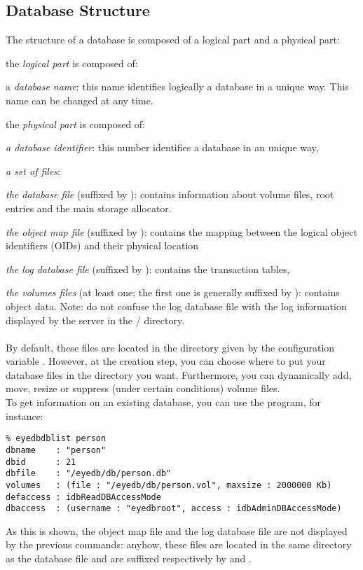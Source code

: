 \subsection{Database Structure}
The structure of a database is composed of a logical part and a physical
part:
\bi
\item the \emph{logical part} is composed of:
\be
\item a \emph{database name}: this name identifies logically 
a database in a unique way. This name can be changed at any time.
\ee
\item the \emph{physical part} is composed of:
\be
\item \emph{a database identifier}: this number identifies
a database in an unique way,
\ee
\item \emph{a set of files}:
\be
\item \emph{the database file} (suffixed by ): contains information
about volume files, root entries and the main storage allocator.
\item \emph{the object map file} (suffixed by ): contains
the mapping between the logical object identifiers (OIDs) and their
physical location
\item \emph{the log database file} (suffixed by ): contains the transaction
tables,
\item \emph{the volumes files} (at least one; the first one is generally suffixed by ):
contains object data.
\ee
\ei
Note: do not confuse the log database file with the log information displayed by
the server in the \tdir/ directory.
\\
\\
By default, these files are located in the directory given by the configuration
variable .
However, at the creation step, you can choose where to put your database
files in the directory you want. Furthermore, you can dynamically add, 
move, resize or suppress (under certain conditions) volume files.
\\
To get information on an existing database, you can use the 
program, for instance:
\verbsize
\begin{verbatim}
% eyedbdblist person
dbname    : "person"
dbid      : 21
dbfile    : "/eyedb/db/person.db"
volumes   : (file : "/eyedb/db/person.vol", maxsize : 2000000 Kb)
defaccess : idbReadDBAccessMode
dbaccess  : (username : "eyedbroot", access : idbAdminDBAccessMode)
\end{verbatim}
\normalsize
As this is shown, the object map file and the log database file are
not displayed by the previous commands: anyhow, these files are
located in the same directory as the database file and are
suffixed respectively by  and .

